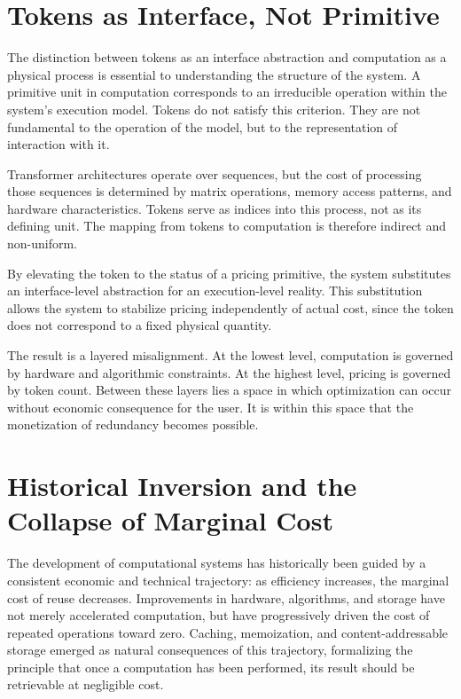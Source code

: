 \documentclass[12pt, oneside]{article}
\begin{document}
\section{Tokens as Interface, Not Primitive}

The distinction between tokens as an interface abstraction and computation as a physical process is essential to understanding the structure of the system. A primitive unit in computation corresponds to an irreducible operation within the system's execution model. Tokens do not satisfy this criterion. They are not fundamental to the operation of the model, but to the representation of interaction with it.

Transformer architectures operate over sequences, but the cost of processing those sequences is determined by matrix operations, memory access patterns, and hardware characteristics. Tokens serve as indices into this process, not as its defining unit. The mapping from tokens to computation is therefore indirect and non-uniform.

By elevating the token to the status of a pricing primitive, the system substitutes an interface-level abstraction for an execution-level reality. This substitution allows the system to stabilize pricing independently of actual cost, since the token does not correspond to a fixed physical quantity.

The result is a layered misalignment. At the lowest level, computation is governed by hardware and algorithmic constraints. At the highest level, pricing is governed by token count. Between these layers lies a space in which optimization can occur without economic consequence for the user. It is within this space that the monetization of redundancy becomes possible.

\section{Historical Inversion and the Collapse of Marginal Cost}

The development of computational systems has historically been guided by a consistent economic and technical trajectory: as efficiency increases, the marginal cost of reuse decreases. Improvements in hardware, algorithms, and storage have not merely accelerated computation, but have progressively driven the cost of repeated operations toward zero. Caching, memoization, and content-addressable storage emerged as natural consequences of this trajectory, formalizing the principle that once a computation has been performed, its result should be retrievable at negligible cost.
\end{document}
